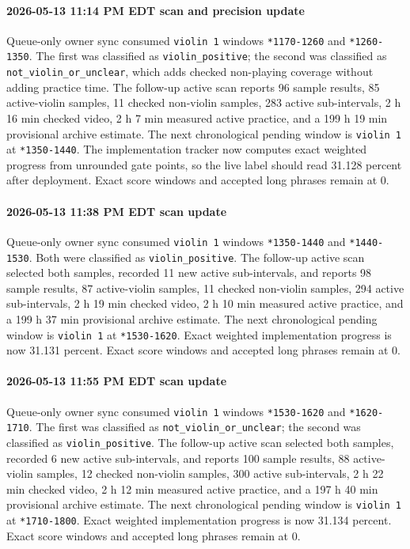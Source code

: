 \paragraph{2026-05-13 11:14 PM EDT scan and precision update} Queue-only owner sync consumed \texttt{violin 1} windows \texttt{*1170-1260} and \texttt{*1260-1350}. The first was classified as \texttt{violin\_positive}; the second was classified as \texttt{not\_violin\_or\_unclear}, which adds checked non-playing coverage without adding practice time. The follow-up active scan reports 96 sample results, 85 active-violin samples, 11 checked non-violin samples, 283 active sub-intervals, 2 h 16 min checked video, 2 h 7 min measured active practice, and a 199 h 19 min provisional archive estimate. The next chronological pending window is \texttt{violin 1} at \texttt{*1350-1440}. The implementation tracker now computes exact weighted progress from unrounded gate points, so the live label should read 31.128 percent after deployment. Exact score windows and accepted long phrases remain at 0.
\paragraph{2026-05-13 11:38 PM EDT scan update} Queue-only owner sync consumed \texttt{violin 1} windows \texttt{*1350-1440} and \texttt{*1440-1530}. Both were classified as \texttt{violin\_positive}. The follow-up active scan selected both samples, recorded 11 new active sub-intervals, and reports 98 sample results, 87 active-violin samples, 11 checked non-violin samples, 294 active sub-intervals, 2 h 19 min checked video, 2 h 10 min measured active practice, and a 199 h 37 min provisional archive estimate. The next chronological pending window is \texttt{violin 1} at \texttt{*1530-1620}. Exact weighted implementation progress is now 31.131 percent. Exact score windows and accepted long phrases remain at 0.
\paragraph{2026-05-13 11:55 PM EDT scan update} Queue-only owner sync consumed \texttt{violin 1} windows \texttt{*1530-1620} and \texttt{*1620-1710}. The first was classified as \texttt{not\_violin\_or\_unclear}; the second was classified as \texttt{violin\_positive}. The follow-up active scan selected both samples, recorded 6 new active sub-intervals, and reports 100 sample results, 88 active-violin samples, 12 checked non-violin samples, 300 active sub-intervals, 2 h 22 min checked video, 2 h 12 min measured active practice, and a 197 h 40 min provisional archive estimate. The next chronological pending window is \texttt{violin 1} at \texttt{*1710-1800}. Exact weighted implementation progress is now 31.134 percent. Exact score windows and accepted long phrases remain at 0.
